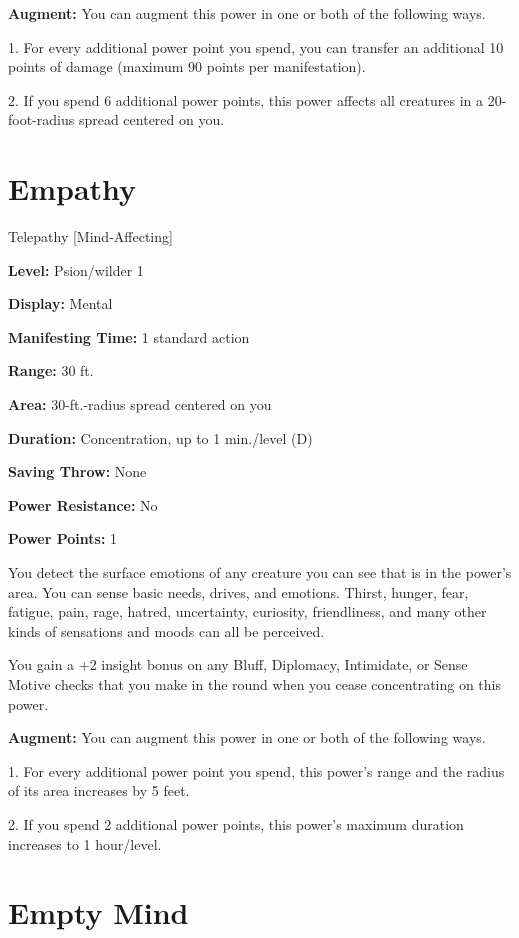 \documentclass{article}
\begin{document}
\textbf{Augment:} You can augment this power in one or both of the following ways.

1. For every additional power point you spend, you can transfer an additional 10 
points of damage (maximum 90 points per manifestation).

2. If you spend 6 additional power points, this power affects all creatures in 
a 20-foot-radius spread centered on you.

\vspace{12pt}
\section*{Empathy}

Telepathy [Mind-Affecting]

\textbf{Level:} Psion/wilder 1

\textbf{Display:} Mental

\textbf{Manifesting Time:} 1 standard action

\textbf{Range:} 30 ft.

\textbf{Area:} 30-ft.-radius spread centered on you

\textbf{Duration:} Concentration, up to 1 min./level (D)

\textbf{Saving Throw:} None

\textbf{Power Resistance:} No

\textbf{Power Points:} 1

You detect the surface emotions of any creature you can see that is in the power's 
area. You can sense basic needs, drives, and emotions. Thirst, hunger, fear, fatigue, 
pain, rage, hatred, uncertainty, curiosity, friendliness, and many other kinds 
of sensations and moods can all be perceived.

You gain a +2 insight bonus on any Bluff, Diplomacy, Intimidate, or Sense Motive 
checks that you make in the round when you cease concentrating on this power.

\textbf{Augment:} You can augment this power in one or both of the following ways.

1. For every additional power point you spend, this power's range and the radius 
of its area increases by 5 feet.

2. If you spend 2 additional power points, this power's maximum duration increases 
to 1 hour/level.

\vspace{12pt}
\section*{Empty Mind}
\end{document}
